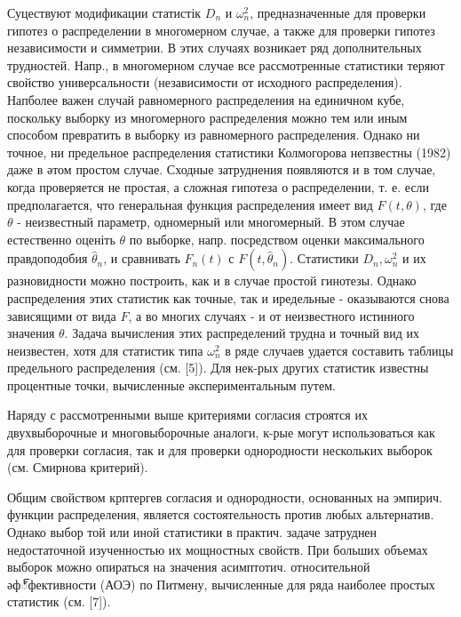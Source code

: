 \documentclass[10pt]{article}
\begin{document}
Суцествуют модификации статистік $D_{n}$ и $\omega_{n}^{2}$, предназначенные для проверки гипотез о распределении в многомерном случае, а также для проверки гипотез независимости и симметрии. В этих случаях возникает ряд дополнительных трудностей. Напр., в многомерном случае все рассмотренные статистики теряют свойство универсальности (независимости от исходного распределения). Напболее важен случай равномерного распределения на единичном кубе, поскольку выборку из многомерного распределения можно тем или иным способом превратить в выборку из равномерного распределения. Однако ни точное, ни предельное распределения статистики Колмогорова непзвестны (1982) даже в әтом простом случае. Сходные затруднения появляются и в том случае, когда проверяется не простая, а сложная гипотеза о распределении, т. е. если предполагается, что генеральная функция распределения имеет вид $F(t, \theta)$, где $\theta$ - неизвестный параметр, одномерный или многомерный. В этом случае естественно оценіть $\theta$ по выборке, напр. посредством оценки максимального правдоподобия $\hat{\theta}_{n}$, и сравнивать $F_{n}(t)$ с $F\left(t, \hat{\theta}_{n}\right)$. Статистики $D_{n}, \omega_{n}^{2}$ и их разновидности можно построить, как и в случае простой гинотезы. Однако распределения этих статистик как точные, так и иредельные - оказываются снова зависящими от вида $F$, а во многих случаях - и от неизвестного истинного значения $\theta$. Задача вычисления этих распределений трудна и точный вид их неизвестен, хотя для статистик типа $\omega_{n}^{2}$ в ряде случаев удается составить таблицы предельного распределения (см. [5]). Для нек-рых других статистик известны процентные точки, вычисленные әкспериментальным путем.



Наряду с рассмотренными выше критериями согласия строятся их двухвыборочные и многовыборочные аналоги, к-рые могут использоваться как для проверки согласия, так и для проверки однородности нескольких выборок (см. Смирнова критерий).



Общим свойством крптергев согласия и однородности, основанных на эмпирич. функции распределения, является состоятельность против любых альтернатив. Однако выбор той или иной статистики в практич. задаче затруднен недостаточной изученностью их мощностных свойств. При больших объемах выборок можно опираться на значения асимптотич. относительной әф్фективности (АОЭ) по Питмену, вычисленные для ряда наиболее простых статистик (см. [7]).
\end{document}
